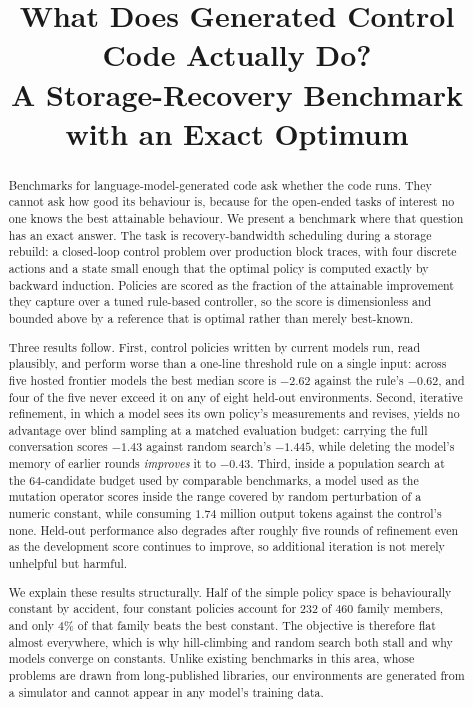 \documentclass[conference]{IEEEtran}
\newcommand{\TODO}[1]{\textcolor{red}{\textbf{[TODO: #1]}}}
\begin{document}
\title{What Does Generated Control Code Actually Do?\\
A Storage-Recovery Benchmark with an Exact Optimum}

\author{\IEEEauthorblockN{\TODO{author list}}
}

\maketitle

\begin{abstract}
Benchmarks for language-model-generated code ask whether the code runs. They cannot ask
how good its behaviour is, because for the open-ended tasks of interest no one knows the
best attainable behaviour. We present a benchmark where that question has an exact
answer. The task is recovery-bandwidth scheduling during a storage rebuild: a closed-loop
control problem over production block traces, with four discrete actions and a state
small enough that the optimal policy is computed exactly by backward induction. Policies
are scored as the fraction of the attainable improvement they capture over a tuned
rule-based controller, so the score is dimensionless and bounded above by a reference
that is optimal rather than merely best-known.

Three results follow. First, control policies written by current models run, read
plausibly, and perform worse than a one-line threshold rule on a single input: across
five hosted frontier models the best median score is $-2.62$ against the rule's $-0.62$,
and four of the five never exceed it on any of eight held-out environments.
Second, iterative refinement, in which a model sees its own policy's measurements and
revises, yields no advantage over blind sampling at a matched evaluation budget: carrying
the full conversation scores $-1.43$ against random search's $-1.445$, while deleting the
model's memory of earlier rounds \emph{improves} it to $-0.43$. Third, inside a population search at the $64$-candidate budget used by comparable
benchmarks, a model used as the mutation operator scores inside the range covered by
random perturbation of a numeric constant, while consuming $1.74$ million output tokens
against the control's none. Held-out performance also degrades after roughly five rounds
of refinement even as the development score continues to improve, so additional iteration
is not merely unhelpful but harmful.

We explain these results structurally. Half of the simple policy space is behaviourally
constant by accident, four constant policies account for $232$ of $460$ family members,
and only $4\%$ of that family beats the best constant. The objective is therefore flat
almost everywhere, which is why hill-climbing and random search both stall and why models
converge on constants. Unlike existing benchmarks in this area, whose problems are drawn
from long-published libraries, our environments are generated from a simulator and cannot
appear in any model's training data.
\end{abstract}
\end{document}
